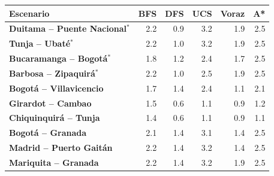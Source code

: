 \renewcommand{\arraystretch}{1.2}
\begin{tabular}{|l|r|r|r|r|r|}
\hline
\rowcolor{gray!20} \textbf{Escenario} & \textbf{BFS} & \textbf{DFS} & \textbf{UCS} & \textbf{Voraz} & \textbf{A*} \\
\hline
\textbf{Duitama -- Puente Nacional$^{*}$} & 2.2 & 0.9 & 3.2 & 1.9 & 2.5 \\
\hline
\textbf{Tunja -- Ubaté$^{*}$} & 2.2 & 1.0 & 3.2 & 1.9 & 2.5 \\
\hline
\textbf{Bucaramanga -- Bogotá$^{*}$} & 1.8 & 1.2 & 2.4 & 1.7 & 2.5 \\
\hline
\textbf{Barbosa -- Zipaquirá$^{*}$} & 2.2 & 1.0 & 2.5 & 1.9 & 2.5 \\
\hline
\textbf{Bogotá -- Villavicencio} & 1.7 & 1.4 & 2.4 & 1.1 & 2.1 \\
\hline
\textbf{Girardot -- Cambao} & 1.5 & 0.6 & 1.1 & 0.9 & 1.2 \\
\hline
\textbf{Chiquinquirá -- Tunja} & 1.4 & 0.6 & 1.1 & 0.9 & 1.1 \\
\hline
\textbf{Bogotá -- Granada} & 2.1 & 1.4 & 3.1 & 1.4 & 2.5 \\
\hline
\textbf{Madrid -- Puerto Gaitán} & 2.2 & 1.4 & 3.2 & 1.4 & 2.5 \\
\hline
\textbf{Mariquita -- Granada} & 2.2 & 1.4 & 3.2 & 1.9 & 2.5 \\
\hline
\end{tabular}
